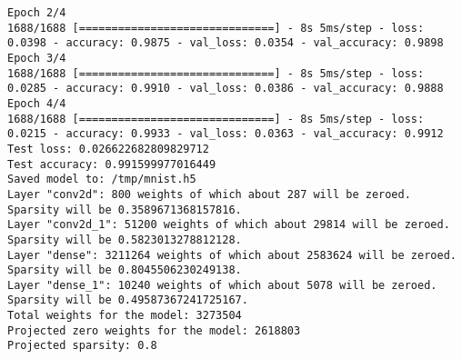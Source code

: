 \begin{lstlisting}[label={lst:mnistpipelineoutput},
    caption=MNIST pipeline output execution]
Epoch 2/4
1688/1688 [==============================] - 8s 5ms/step - loss: 0.0398 - accuracy: 0.9875 - val_loss: 0.0354 - val_accuracy: 0.9898
Epoch 3/4
1688/1688 [==============================] - 8s 5ms/step - loss: 0.0285 - accuracy: 0.9910 - val_loss: 0.0386 - val_accuracy: 0.9888
Epoch 4/4
1688/1688 [==============================] - 8s 5ms/step - loss: 0.0215 - accuracy: 0.9933 - val_loss: 0.0363 - val_accuracy: 0.9912
Test loss: 0.026622682809829712
Test accuracy: 0.991599977016449
Saved model to: /tmp/mnist.h5
Layer "conv2d": 800 weights of which about 287 will be zeroed. Sparsity will be 0.3589671368157816.
Layer "conv2d_1": 51200 weights of which about 29814 will be zeroed. Sparsity will be 0.5823013278812128.
Layer "dense": 3211264 weights of which about 2583624 will be zeroed. Sparsity will be 0.8045506230249138.
Layer "dense_1": 10240 weights of which about 5078 will be zeroed. Sparsity will be 0.49587367241725167.
Total weights for the model: 3273504
Projected zero weights for the model: 2618803
Projected sparsity: 0.8


\end{lstlisting}
